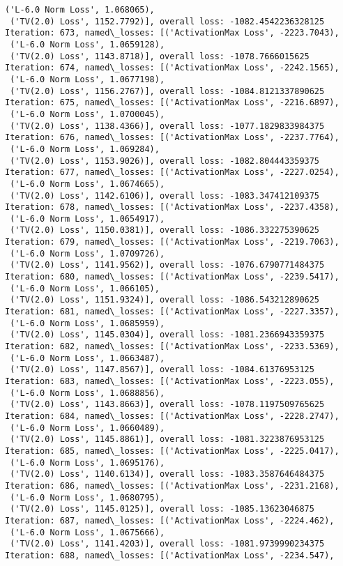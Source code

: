 \documentclass[10pt]{article}
\begin{document}
\begin{Verbatim}[commandchars=\\\{\}]
 ('L-6.0 Norm Loss', 1.068065),
 ('TV(2.0) Loss', 1152.7792)], overall loss: -1082.4542236328125
Iteration: 673, named\_losses: [('ActivationMax Loss', -2223.7043),
 ('L-6.0 Norm Loss', 1.0659128),
 ('TV(2.0) Loss', 1143.8718)], overall loss: -1078.7666015625
Iteration: 674, named\_losses: [('ActivationMax Loss', -2242.1565),
 ('L-6.0 Norm Loss', 1.0677198),
 ('TV(2.0) Loss', 1156.2767)], overall loss: -1084.8121337890625
Iteration: 675, named\_losses: [('ActivationMax Loss', -2216.6897),
 ('L-6.0 Norm Loss', 1.0700045),
 ('TV(2.0) Loss', 1138.4366)], overall loss: -1077.1829833984375
Iteration: 676, named\_losses: [('ActivationMax Loss', -2237.7764),
 ('L-6.0 Norm Loss', 1.069284),
 ('TV(2.0) Loss', 1153.9026)], overall loss: -1082.804443359375
Iteration: 677, named\_losses: [('ActivationMax Loss', -2227.0254),
 ('L-6.0 Norm Loss', 1.0674665),
 ('TV(2.0) Loss', 1142.6106)], overall loss: -1083.347412109375
Iteration: 678, named\_losses: [('ActivationMax Loss', -2237.4358),
 ('L-6.0 Norm Loss', 1.0654917),
 ('TV(2.0) Loss', 1150.0381)], overall loss: -1086.332275390625
Iteration: 679, named\_losses: [('ActivationMax Loss', -2219.7063),
 ('L-6.0 Norm Loss', 1.0709726),
 ('TV(2.0) Loss', 1141.9562)], overall loss: -1076.6790771484375
Iteration: 680, named\_losses: [('ActivationMax Loss', -2239.5417),
 ('L-6.0 Norm Loss', 1.066105),
 ('TV(2.0) Loss', 1151.9324)], overall loss: -1086.543212890625
Iteration: 681, named\_losses: [('ActivationMax Loss', -2227.3357),
 ('L-6.0 Norm Loss', 1.0685959),
 ('TV(2.0) Loss', 1145.0304)], overall loss: -1081.2366943359375
Iteration: 682, named\_losses: [('ActivationMax Loss', -2233.5369),
 ('L-6.0 Norm Loss', 1.0663487),
 ('TV(2.0) Loss', 1147.8567)], overall loss: -1084.61376953125
Iteration: 683, named\_losses: [('ActivationMax Loss', -2223.055),
 ('L-6.0 Norm Loss', 1.0688856),
 ('TV(2.0) Loss', 1143.8663)], overall loss: -1078.1197509765625
Iteration: 684, named\_losses: [('ActivationMax Loss', -2228.2747),
 ('L-6.0 Norm Loss', 1.0660489),
 ('TV(2.0) Loss', 1145.8861)], overall loss: -1081.3223876953125
Iteration: 685, named\_losses: [('ActivationMax Loss', -2225.0417),
 ('L-6.0 Norm Loss', 1.0695176),
 ('TV(2.0) Loss', 1140.6134)], overall loss: -1083.3587646484375
Iteration: 686, named\_losses: [('ActivationMax Loss', -2231.2168),
 ('L-6.0 Norm Loss', 1.0680795),
 ('TV(2.0) Loss', 1145.0125)], overall loss: -1085.13623046875
Iteration: 687, named\_losses: [('ActivationMax Loss', -2224.462),
 ('L-6.0 Norm Loss', 1.0675666),
 ('TV(2.0) Loss', 1141.4203)], overall loss: -1081.9739990234375
Iteration: 688, named\_losses: [('ActivationMax Loss', -2234.547),

\end{Verbatim}
\end{document}
